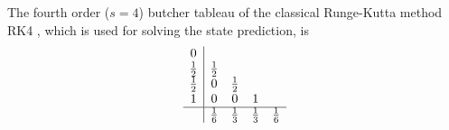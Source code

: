 The fourth order ($s=4$) butcher tableau of the classical Runge-Kutta method RK4 \cite{griffiths2010}, which is used for solving the state prediction, is 
\begin{equation}
    \begin{array}{c|cccc}
        0 &  &  &  &  \\
        \frac{1}{2} & \frac{1}{2} &  &  &  \\
        \frac{1}{2} & 0 & \frac{1}{2} & & \\
        1 & 0 & 0 & 1 &  \\
        \hline 
        & \frac{1}{6} & \frac{1}{3} & \frac{1}{3} & \frac{1}{6}
    \end{array}
    \label{eq:appendix_rk4_butcher}
\end{equation}